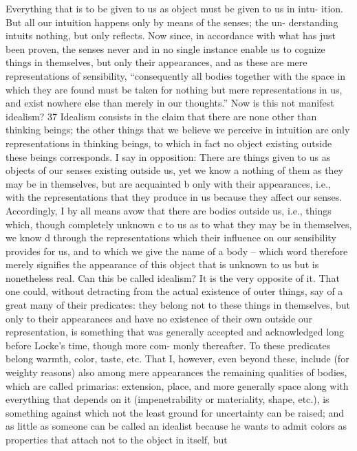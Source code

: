 Everything that is to be given to us as object must be given to us in intu-
ition. But all our intuition happens only by means of the senses; the un-
derstanding intuits nothing, but only reﬂects. Now since, in accordance
with what has just been proven, the senses never and in no single instance
enable us to cognize things in themselves, but only their appearances,
and as these are mere representations of sensibility, “consequently all
bodies together with the space in which they are found must be taken
for nothing but mere representations in us, and exist nowhere else than
merely in our thoughts.” Now is this not manifest idealism? 37
Idealism consists in the claim that there are none other than thinking
beings; the other things that we believe we perceive in intuition are only
representations in thinking beings, to which in fact no object existing
outside these beings corresponds. I say in opposition: There are things
given to us as objects of our senses existing outside us, yet we know a
nothing of them as they may be in themselves, but are acquainted b only
with their appearances, i.e., with the representations that they produce
in us because they affect our senses. Accordingly, I by all means avow
that there are bodies outside us, i.e., things which, though completely
unknown c to us as to what they may be in themselves, we know d through
the representations which their inﬂuence on our sensibility provides for
us, and to which we give the name of a body – which word therefore
merely signiﬁes the appearance of this object that is unknown to us but
is nonetheless real. Can this be called idealism? It is the very opposite of it.
That one could, without detracting from the actual existence of outer
things, say of a great many of their predicates: they belong not to these
things in themselves, but only to their appearances and have no existence
of their own outside our representation, is something that was generally
accepted and acknowledged long before Locke’s time, though more com-
monly thereafter. To these predicates belong warmth, color, taste, etc.
That I, however, even beyond these, include (for weighty reasons) also
among mere appearances the remaining qualities of bodies, which are
called primarias: extension, place, and more generally space along with
everything that depends on it (impenetrability or materiality, shape, etc.),
is something against which not the least ground for uncertainty can be
raised; and as little as someone can be called an idealist because he wants
to admit colors as properties that attach not to the object in itself, but
